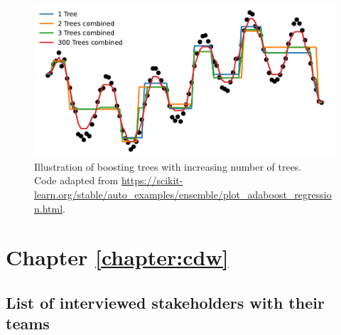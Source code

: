 \documentclass[french,12pt,twoside,a4paper]{book}
\let\fontnumber\relax
\renewcommand{\thesection}{\fontnumber{\color{chaptercolor}\arabic{chapter}.}\arabic{section}}
\renewcommand{\thesubsection}{\fontnumber{\color{chaptercolor}\arabic{chapter}.}\arabic{section}.\arabic{subsection}}
\begin{document}
\begin{appendices}
  \begin{figure}[!b]
    \centering
    \includegraphics[width=0.8\linewidth]{img/chapter_1/boosting_4.pdf}
    \caption{Illustration of boosting trees with increasing number of
      trees.\\Code adapted from
      \url{https://scikit-learn.org/stable/auto_examples/ensemble/plot_adaboost_regression.html}.}%
    \label{fig:boosting_regression}
  \end{figure}

  \chapter{Chapter \ref{chapter:cdw}}\label{apd:cdw}

  \section{List of interviewed stakeholders with their
    teams}\label{apd:cdw:table:expert_teams}


\end{appendices}
\end{document}
